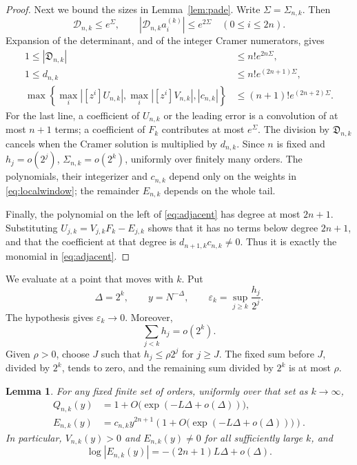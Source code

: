\documentclass{amsart}
\newtheorem{lemma}{Lemma}[section]
\numberwithin{equation}{section}
\begin{document}
\begin{proof}
Next we bound the sizes in Lemma~\ref{lem:pade}.
Write $\Sigma=\Sigma_{n,k}$. Then
\[
\mathcal D_{n,k}\le e^{\Sigma},\qquad
|\mathcal D_{n,k}a_i^{(k)}|\le e^{2\Sigma}
\quad(0\le i\le2n).
\]
Expansion of the determinant, and of the integer Cramer numerators,
gives
\begin{equation}\label{eq:coefficientcost}
\begin{aligned}
1\le|\mathfrak D_{n,k}|&\le n!e^{2n\Sigma},\\
1\le d_{n,k}&\le n!e^{(2n+1)\Sigma},\\
\max\left\{\max_i|[z^i]U_{n,k}|,
\max_i|[z^i]V_{n,k}|,|c_{n,k}|\right\}
 &\le(n+1)!e^{(2n+2)\Sigma}.
\end{aligned}
\end{equation}
For the last line, a coefficient of $U_{n,k}$ or the leading error
is a convolution of at most $n+1$ terms; a coefficient of $F_k$
contributes at most $e^{\Sigma}$. The division by
$\mathfrak D_{n,k}$ cancels when the Cramer solution is multiplied by
$d_{n,k}$.
Since $n$ is fixed and $h_j=o(2^j)$, $\Sigma_{n,k}=o(2^k)$,
uniformly over finitely many orders. The polynomials, their integerizer
and $c_{n,k}$ depend only on the weights in \eqref{eq:localwindow};
the remainder $E_{n,k}$ depends on the whole tail.

Finally, the polynomial on the left of \eqref{eq:adjacent} has degree
at most $2n+1$. Substituting $U_{j,k}=V_{j,k}F_k-E_{j,k}$ shows that
it has no terms below degree $2n+1$, and that the coefficient at that
degree is $d_{n+1,k}c_{n,k}\ne0$. Thus it is exactly the monomial
in \eqref{eq:adjacent}.
\end{proof}

We evaluate at a point that moves with $k$.
Put
\begin{equation}\label{eq:movingpoint}
\Delta=2^k,\qquad y=N^{-\Delta},\qquad
\varepsilon_k=\sup_{j\ge k}\frac{h_j}{2^j}.
\end{equation}
The hypothesis gives $\varepsilon_k\to0$. Moreover,
\begin{equation}\label{eq:prefixheight}
\sum_{j<k}h_j=o(2^k).
\end{equation}
Given $\rho>0$, choose $J$ such that $h_j\le\rho2^j$ for
$j\ge J$. The fixed sum before $J$, divided by $2^k$, tends to zero,
and the remaining sum divided by $2^k$ is at most $\rho$.

\begin{lemma}\label{lem:local}
For any fixed finite set of orders, uniformly over that set as
$k\to\infty$,
\begin{align}
Q_{n,k}(y)&=1+O\bigl(\exp(-L\Delta+o(\Delta))\bigr),\label{eq:Vbounds}\\
E_{n,k}(y)&=c_{n,k}y^{2n+1}
 \left(1+O\bigl(\exp(-L\Delta+o(\Delta))\bigr)\right).
 \label{eq:Ebounds}
\end{align}
In particular, $V_{n,k}(y)>0$ and $E_{n,k}(y)\ne0$ for all
sufficiently large $k$, and
\begin{equation}\label{eq:errorlog}
\log|E_{n,k}(y)|=-(2n+1)L\Delta+o(\Delta).
\end{equation}
\end{lemma}
\end{document}
